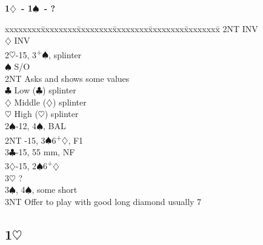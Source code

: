 \documentclass[10pt]{article}
\renewcommand{\c}{$\clubsuit$}
\renewcommand{\d}{$\diamondsuit$}
\newcommand{\h}{$\heartsuit$}
\newcommand{\s}{$\spadesuit$}
\newcommand{\p}{\textsuperscript{+}}
\newcommand{\m}{\textsuperscript{\textminus}}
\newenvironment{bidtable}[1][]
{\textbf{#1}
  \begin{adjustwidth}{1em}{}
    \addvspace{2pt}
    \begin{tabbing}
      xxxxxxxx\=xxxxxxxx\=xxxxxxxx\=xxxxxxxx\=xxxxxxxx\=xxxxxxxx\=\kill}
{\end{tabbing}\end{adjustwidth}\bigskip}%
\newcommand{\pdfh}{\texorpdfstring{\h{}}{H}}
\begin{document}
\begin{multicols*}{2}
\begin{bidtable}[1\d\ - 1\s\ - ?]
     \> 2NT  \> INV                                    \\
     \d  \> INV                                    \\
2\h  {}-15, 3\p\s, splinter                         \\%
     \s  \> S/O                                    \\
     \> 2NT  \> Asks and shows some values             \\
     \>      \c \> Low (\c) splinter               \\
     \>      \d \> Middle (\d) splinter            \\
     \>      \h \> High (\h) splinter              \\
2\s  {}-12, 4\s, BAL                                \\
2NT  -15, 3\s 6\p\d, F1                           \\
3\c  {}-15, 55 mm, NF                               \\
3\d  {}-15, 2\m\s 6\p\d                             \\
3\h  \> ?                                              \\
3\s  {}, 4\s, some short                            \\
3NT  \> Offer to play with good long diamond usually 7 \\
\end{bidtable}

\newpage
\subsection{1\pdfh}


\end{multicols*}
\end{document}
